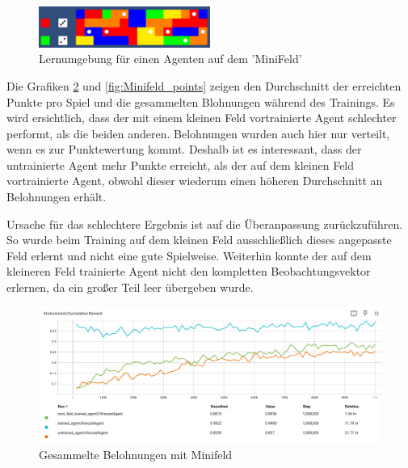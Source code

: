 

\begin{figure}[!h]
	\centering
	\includegraphics[width=0.5\textwidth]{Bilder/miniFeld.png}
	\caption{Lernumgebung für einen Agenten auf dem 'MiniFeld'}
	\label{fig:miniFeld}
\end{figure}
\newpage

Die Grafiken \ref{fig:Minifeld_rewards} und \ref{fig:Minifeld_points} zeigen den Durchschnitt der erreichten Punkte pro Spiel und die gesammelten Blohnungen während des Trainings.
Es wird ersichtlich, dass der mit einem kleinen Feld vortrainierte Agent schlechter performt, als die beiden anderen. Belohnungen wurden auch hier nur verteilt, wenn es zur Punktewertung kommt. Deshalb ist es interessant, dass der untrainierte Agent mehr Punkte erreicht, als der auf dem kleinen Feld vortrainierte Agent, obwohl dieser wiederum einen höheren Durchschnitt an Belohnungen erhält. 

Ursache für das schlechtere Ergebnis ist auf die Überanpassung zurückzuführen. So wurde beim Training auf dem kleinen Feld ausschließlich dieses  angepasste Feld erlernt und nicht eine gute Spielweise. Weiterhin konnte der auf dem kleineren Feld trainierte Agent nicht den kompletten Beobachtungsvektor erlernen, da ein großer Teil leer übergeben wurde.


\begin{figure}[!h]
    \centering
    \includegraphics[scale=0.3]{Bilder/rewards_minifield.png}
    \caption{Gesammelte Belohnungen mit Minifeld}
    \label{fig:Minifeld_rewards}
\end{figure}

